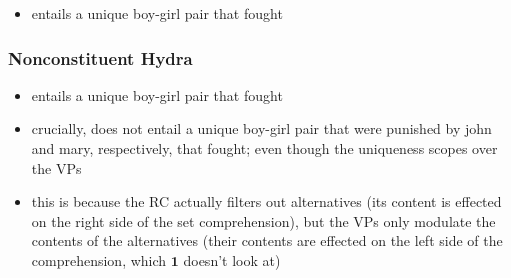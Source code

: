 \documentclass{article}
\newcommand{\one}{\textbf{1}}
\newcommand{\gap}{\rule[0.5mm]{3mm}{1.5pt}}
\newcommand{\who}{\textbf{who}}
\begin{document}

\begin{itemize}
  \item
    entails a unique boy-girl pair that fought
\end{itemize}


\subsubsection{Nonconstituent Hydra}



\begin{itemize}
  \item
    entails a unique boy-girl pair that fought
  \item
    crucially, does not entail a unique boy-girl pair that were punished by
    john and mary, respectively, that fought; even though the uniqueness
    scopes over the VPs
  \item
    this is because the RC actually filters out alternatives (its content is
    effected on the right side of the set comprehension), but the VPs only
    modulate the contents of the alternatives (their contents are effected on
    the left side of the comprehension, which $\one$ doesn't look at)
\end{itemize}
\end{document}

